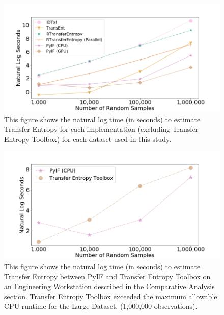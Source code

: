 
\begin{figure}
  \centerline{\includegraphics[scale=0.8]{figures/PyIF/WallTime-TE.png}}
  \caption{This figure shows the natural log time (in seconds) to estimate Transfer Entropy for each implementation (excluding Transfer Entropy Toolbox) for each dataset used in this study. }
  \label{TE-walltime}
\end{figure}


\begin{figure}
  \centerline{\includegraphics[scale=0.8]{figures/PyIF/WallTime-TE2.png}}
  \caption{This figure shows the natural log time (in seconds) to estimate Transfer Entropy between PyIF and Transfer Entropy Toolbox on an Engineering Workstation described in the Comparative Analysis section. Transfer Entropy Toolbox exceeded the maximum allowable CPU runtime for the Large Dataset. (1,000,000 observations). }
  \label{TE-walltime2}
\end{figure}

